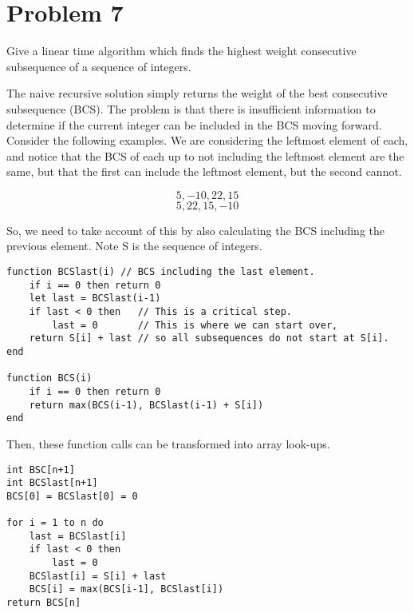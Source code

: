 \documentclass{article}
\providecommand{\prob}[1]{\section*{Problem #1}}
\begin{document}
    \pagebreak
    \prob{7}
    Give a linear time algorithm which finds the highest weight consecutive subsequence of a sequence of integers.
    
    The naive recursive solution simply returns the weight of the best consecutive subsequence (BCS).
    The problem is that there is insufficient information to determine if the current integer can be included in the BCS moving forward.
    Consider the following examples. We are considering the leftmost element of each, and notice that the BCS of each up to not including the leftmost element are the same, but that the first can include the leftmost element, but the second cannot.
    
    \[5, -10, 22, 15 \]
    \[5, 22, 15, -10 \]
    
    So, we need to take account of this by also calculating the BCS including the previous element. Note S is the sequence of integers.
    
    \begin{lstlisting}
function BCSlast(i) // BCS including the last element.
    if i == 0 then return 0
    let last = BCSlast(i-1)
    if last < 0 then   // This is a critical step.
        last = 0       // This is where we can start over,
    return S[i] + last // so all subsequences do not start at S[i].
end
    
function BCS(i)
    if i == 0 then return 0
    return max(BCS(i-1), BCSlast(i-1) + S[i])
end
    \end{lstlisting}
    
    Then, these function calls can be transformed into array look-ups.
    
    \begin{lstlisting}
int BSC[n+1]
int BCSlast[n+1]
BCS[0] = BCSlast[0] = 0

for i = 1 to n do
    last = BCSlast[i]
    if last < 0 then
        last = 0
    BCSlast[i] = S[i] + last
    BCS[i] = max(BCS[i-1], BCSlast[i])
return BCS[n]
    \end{lstlisting}
\end{document}
